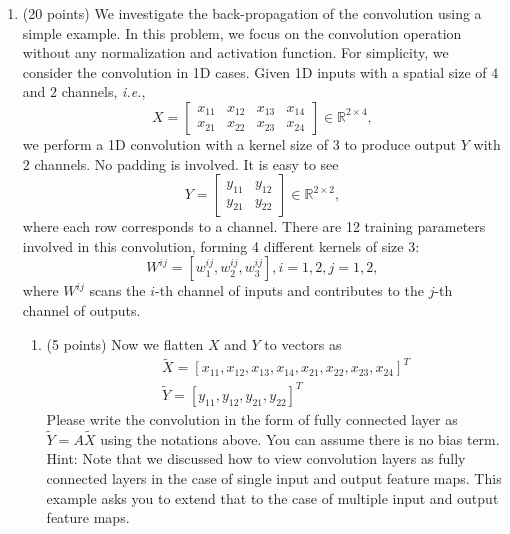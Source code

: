 \documentclass[11pt]{article}
\begin{document}
\begin{enumerate}
    \item (20 points) We investigate the back-propagation of the convolution
    using a simple example. In this problem, we focus on the
    convolution operation without any normalization and
    activation function. For simplicity, we consider the
    convolution in 1D cases. Given 1D inputs with a spatial size
    of $4$ and $2$ channels, \emph{i.e.},
    \begin{equation}
    X=
    \begin{bmatrix}
    x_{11} & x_{12} & x_{13} & x_{14} \\
    x_{21} & x_{22} & x_{23} & x_{24}
    \end{bmatrix}
    \in \mathbb{R}^{2 \times 4},
    \end{equation}
    we perform a 1D convolution with a kernel size of $3$ to
    produce output $Y$ with $2$ channels. No padding is involved.
    It is easy to see
    \begin{equation}
    Y=
    \begin{bmatrix}
    y_{11} & y_{12} \\
    y_{21} & y_{22}
    \end{bmatrix}
    \in \mathbb{R}^{2 \times 2},
    \end{equation}
    where each row corresponds to a channel. There are 12
    training parameters involved in this convolution, forming 4
    different kernels of size $3$:
    \begin{equation}
    W^{ij} = [w^{ij}_1, w^{ij}_2, w^{ij}_3], i=1,2, j=1,2,
    \end{equation}
    where $W^{ij}$ scans the $i$-th channel of inputs and
    contributes to the $j$-th channel of outputs.


    \begin{enumerate}
    \item (5 points) Now we flatten $X$ and $Y$ to vectors as
    \begin{eqnarray}
    &&\tilde X = [x_{11}, x_{12}, x_{13}, x_{14} , x_{21}, x_{22}, x_{23}, x_{24}]^T \nonumber \\
    &&\tilde Y = [y_{11}, y_{12}, y_{21}, y_{22}]^T \nonumber
    \end{eqnarray}
    Please write the convolution in the form of fully connected
    layer as $\tilde Y=A\tilde X$ using the notations above. You
    can assume there is no bias term.\\Hint: Note that we
    discussed how to view convolution layers as fully connected
    layers in the case of single input and output feature maps.
    This example asks you to extend that to the case of multiple
    input and output feature maps.



\end{enumerate}
\end{enumerate}
\end{document}
